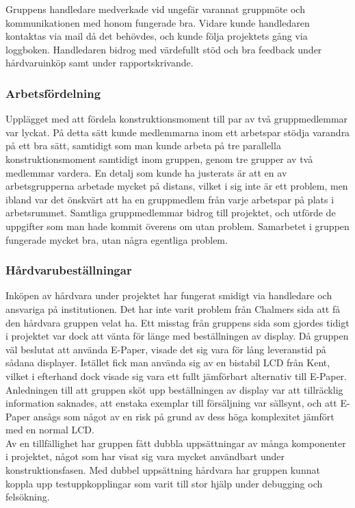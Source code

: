 \documentclass[a4paper,11pt]{article}
\begin{document}
Gruppens handledare medverkade vid ungefär varannat gruppmöte och kommunikationen med honom fungerade bra. Vidare kunde handledaren kontaktas via mail då det behövdes, och kunde följa projektets gång via loggboken. Handledaren bidrog med värdefullt stöd och bra feedback under hårdvaruinköp samt under rapportskrivande.

\subsubsection{Arbetsfördelning}
Upplägget med att fördela konstruktionsmoment till par av två gruppmedlemmar var lyckat. På detta sätt kunde medlemmarna inom ett arbetspar stödja varandra på ett bra sätt, samtidigt som man kunde arbeta på tre parallella konstruktionsmoment samtidigt inom gruppen, genom tre grupper av två medlemmar vardera. En detalj som kunde ha justerats är att en av arbetsgrupperna arbetade mycket på distans, vilket i sig inte är ett problem, men ibland var det önskvärt att ha en gruppmedlem från varje arbetspar på plats i arbetsrummet. Samtliga gruppmedlemmar bidrog till projektet, och utförde de uppgifter som man hade kommit överens om utan problem. Samarbetet i gruppen fungerade mycket bra, utan några egentliga problem.\\
	
\subsubsection{Hårdvarubeställningar}
Inköpen av hårdvara under projektet har fungerat smidigt via handledare och ansvariga på institutionen. Det har inte varit problem från Chalmers sida att få den hårdvara gruppen velat ha. Ett misstag från gruppens sida som gjordes tidigt i projektet var dock att vänta för länge med beställningen av display. Då gruppen väl beslutat att använda E-Paper, visade det sig vara för lång leveranstid på sådana displayer. Istället fick man använda sig av en bistabil LCD från Kent, vilket i efterhand dock visade sig vara ett fullt jämförbart alternativ till E-Paper. Anledningen till att gruppen sköt upp beställningen av display var att tillräcklig information saknades, att enstaka exemplar till försäljning var sällsynt, och att E-Paper ansågs som något av en risk på grund av dess höga komplexitet jämfört med en normal LCD.\\

Av en tillfällighet har gruppen fått dubbla uppsättningar av många komponenter i projektet, något som har visat sig vara mycket användbart under konstruktionsfasen. Med dubbel uppsättning hårdvara har gruppen kunnat koppla upp testuppkopplingar som varit till stor hjälp under debugging och felsökning.
\end{document}
